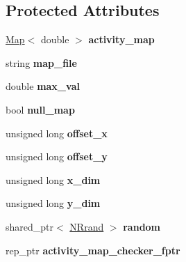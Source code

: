 \subsection*{Protected Attributes}
\begin{DoxyCompactItemize}
\item 
\hyperlink{class_map}{Map}$<$ double $>$ {\bfseries activity\+\_\+map}\hypertarget{class_activity_map_ae6bb212e15a9b8d1dd1fef3a1f54b9f6}{}\label{class_activity_map_ae6bb212e15a9b8d1dd1fef3a1f54b9f6}

\item 
string {\bfseries map\+\_\+file}\hypertarget{class_activity_map_a5d8cd617565cc97b924b78f03b82eb4a}{}\label{class_activity_map_a5d8cd617565cc97b924b78f03b82eb4a}

\item 
double {\bfseries max\+\_\+val}\hypertarget{class_activity_map_a59c10c7e03899876365ef4bc791b3fad}{}\label{class_activity_map_a59c10c7e03899876365ef4bc791b3fad}

\item 
bool {\bfseries null\+\_\+map}\hypertarget{class_activity_map_a3133f8f157fc7abd266ca0b639d4c694}{}\label{class_activity_map_a3133f8f157fc7abd266ca0b639d4c694}

\item 
unsigned long {\bfseries offset\+\_\+x}\hypertarget{class_activity_map_ace785bd2cef75f4280015bb85826705b}{}\label{class_activity_map_ace785bd2cef75f4280015bb85826705b}

\item 
unsigned long {\bfseries offset\+\_\+y}\hypertarget{class_activity_map_a2915cce35c408d864c8234fc41397569}{}\label{class_activity_map_a2915cce35c408d864c8234fc41397569}

\item 
unsigned long {\bfseries x\+\_\+dim}\hypertarget{class_activity_map_a9b1828005d0e5b0c3ea9c6cf384bed1b}{}\label{class_activity_map_a9b1828005d0e5b0c3ea9c6cf384bed1b}

\item 
unsigned long {\bfseries y\+\_\+dim}\hypertarget{class_activity_map_a8a822d954d05e09859a4c7be94b276c0}{}\label{class_activity_map_a8a822d954d05e09859a4c7be94b276c0}

\item 
shared\+\_\+ptr$<$ \hyperlink{class_n_rrand}{N\+Rrand} $>$ {\bfseries random}\hypertarget{class_activity_map_a226799885de8a5535c7cb46af66efed6}{}\label{class_activity_map_a226799885de8a5535c7cb46af66efed6}

\item 
rep\+\_\+ptr {\bfseries activity\+\_\+map\+\_\+checker\+\_\+fptr}\hypertarget{class_activity_map_a9ced752f73123073e076f50b8944e432}{}\label{class_activity_map_a9ced752f73123073e076f50b8944e432}

\end{DoxyCompactItemize}
